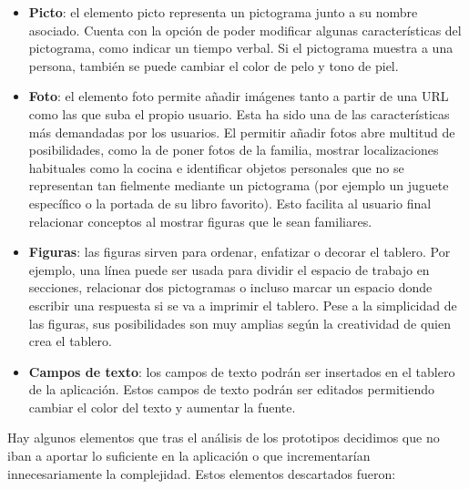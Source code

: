 \begin{itemize}
	
	
	\item \textbf{Picto}: el elemento picto representa un pictograma junto a su nombre asociado. Cuenta con la opción de poder modificar algunas características del pictograma, como indicar un tiempo verbal. Si el pictograma muestra a una persona, también se puede cambiar el color de pelo y tono de piel.
	
	\item \textbf{Foto}: el elemento foto permite añadir imágenes tanto a partir de una URL como las que suba el propio usuario. Esta ha sido una de las características más demandadas por los usuarios. El permitir añadir fotos abre multitud de posibilidades, como la de poner fotos de la familia, mostrar localizaciones habituales como la cocina e identificar objetos personales que no se representan tan fielmente mediante un pictograma (por ejemplo un juguete específico o la portada de su libro favorito). Esto facilita al usuario final relacionar conceptos al mostrar figuras que le sean familiares.
	
	\item \textbf{Figuras}: las figuras sirven para ordenar, enfatizar o decorar el tablero. Por ejemplo, una línea puede ser usada para dividir el espacio de trabajo en secciones, relacionar dos pictogramas o incluso marcar un espacio donde escribir una respuesta si se va a imprimir el tablero. Pese a la simplicidad de las figuras, sus posibilidades son muy amplias según la creatividad de quien crea el tablero.
	
	\item \textbf{Campos de texto}: los campos de texto podrán ser insertados en el tablero de la aplicación. Estos campos de texto podrán ser editados permitiendo cambiar el color del texto y aumentar la fuente.
		
\end{itemize}

Hay algunos elementos que tras el análisis de los prototipos decidimos que no iban a aportar lo suficiente en la aplicación o que incrementarían innecesariamente la complejidad. Estos elementos descartados fueron:

